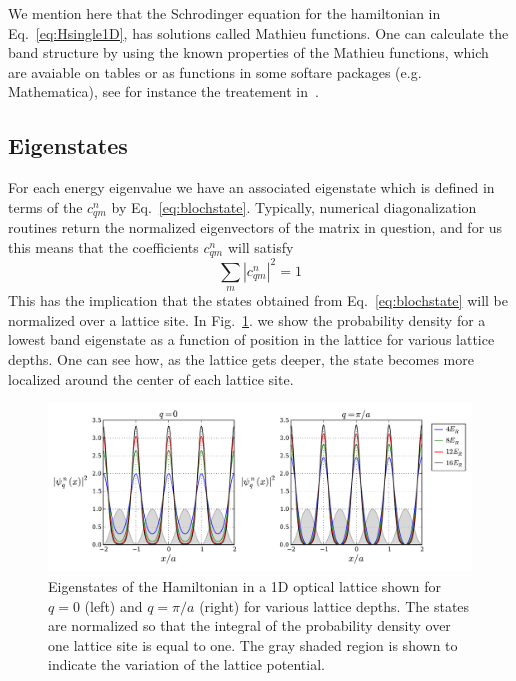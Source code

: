 \documentclass[oneside,11pt]{memoir}
\begin{document}
We mention here that the Schrodinger equation for the hamiltonian in
Eq.~\ref{eq:Hsingle1D}, has solutions called Mathieu functions. 
One can calculate the band structure by using the known properties of the
Mathieu functions, which are avaiable on tables or as functions in some softare
packages (e.g. Mathematica), see for instance the treatement
in~\cite{PhysRev.87.807}. 

\subsection{Eigenstates}
For each energy eigenvalue we have an associated eigenstate  which is defined
in terms of the $c_{qm}^{n}$ by Eq.~\ref{eq:blochstate}.   Typically, numerical
diagonalization routines return the normalized eigenvectors of the matrix in
question,  and for us this means that the coefficients $c_{qm}^{n}$ will
satisfy
\begin{equation}
   \sum_{m} | c_{qm}^{n} |^{2} = 1 
\end{equation} 
This has the implication that the states obtained from Eq.~\ref{eq:blochstate}
will be normalized over a lattice site.  In Fig.~\ref{fig:eigenfuns1d}. we show
the probability density for a lowest band eigenstate as a function of position
in the lattice for various lattice depths.  One can see how, as the lattice
gets deeper, the state becomes more localized around the center of each lattice
site. 
\begin{figure}
\centering \includegraphics[width=\textwidth]{../figures/BandStructure_figures/eigenfuns1d.pdf}
\caption[Eigenstates in 1D lattice.]{\small Eigenstates of the Hamiltonian in a
1D optical lattice shown for $q=0$ (left) and $q=\pi/a$ (right) for various
lattice depths. The states are normalized so that the integral of the
probability density over one lattice site is equal to one.  The gray shaded
region is shown to indicate the variation of the lattice potential. }
\label{fig:eigenfuns1d}
\end{figure}
\end{document}
